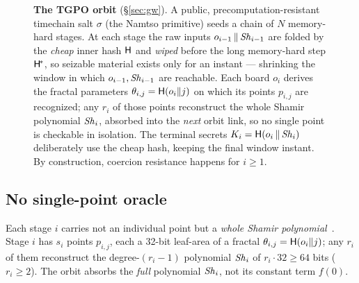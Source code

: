 \begin{figure}[t]
{}
\caption{\textbf{The TGPO orbit} (\S\ref{sec:gw}). A public,
precomputation-resistant timechain salt $\sigma$ (the Namtso primitive) seeds a
chain of $N$ memory-hard stages. At each stage the raw inputs
$o_{i-1}\,\|\,\mathit{Sh}_{i-1}$ are folded by the \emph{cheap} inner hash $\mathsf{H}$ and
\emph{wiped} before the long memory-hard step $\mathsf{H}^{\!*}$, so seizable material
exists only for an instant --- shrinking the window in which $o_{i-1}, \mathit{Sh}_{i-1}$ are
reachable. Each board $o_i$ derives the fractal parameters
$\theta_{i,j} = \mathsf{H}(o_i \| j)$ on which its points $p_{i,j}$ are recognized; any
$r_i$ of those points reconstruct the whole Shamir polynomial $\mathit{Sh}_i$, absorbed into
the \emph{next} orbit link, so no single point is checkable in isolation. The terminal secrets $K_i =
\mathsf{H}(o_i \,\|\, \mathit{Sh}_i)$ deliberately use the cheap hash, keeping the final window
instant. By construction, coercion resistance happens for $i \geq 1$.}
\label{fig:orbit}
\end{figure}

\subsection{No single-point oracle}

Each stage $i$ carries not an individual point but a \emph{whole Shamir
polynomial}~\cite{shamir1979}. Stage $i$ has $s_i$ points $p_{i,j}$, each a
32-bit leaf-area of a fractal $\theta_{i,j} = \mathsf{H}(o_i \| j)$; any $r_i$ of
them reconstruct the degree-$(r_i{-}1)$ polynomial $\mathit{Sh}_i$ of $r_i \cdot 32 \ge
64$ bits ($r_i \ge 2$). The orbit absorbs the \emph{full} polynomial $\mathit{Sh}_i$,
not its constant term $f(0)$.

